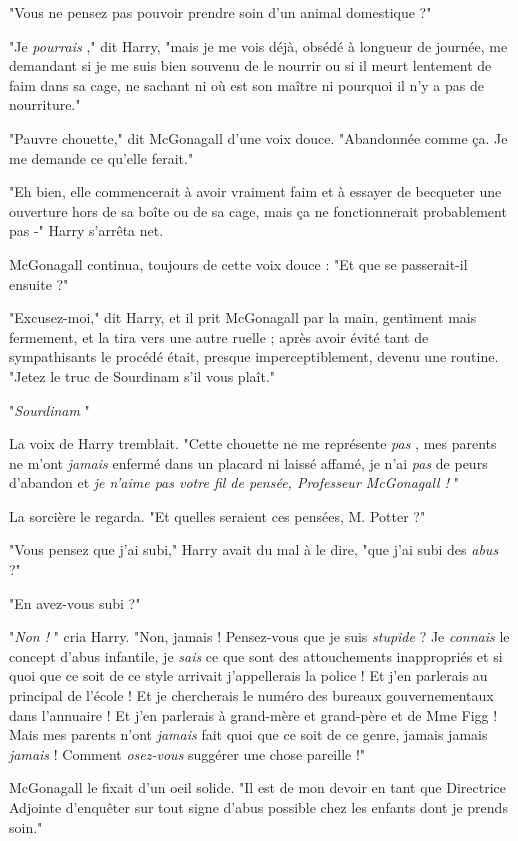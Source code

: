 "Vous ne pensez pas pouvoir prendre soin d'un animal domestique ?"

"Je \emph{pourrais} ," dit Harry, "mais je me vois déjà, obsédé à longueur de journée, me demandant si je me suis bien souvenu de le nourrir ou si il meurt lentement de faim dans sa cage, ne sachant ni où est son maître ni pourquoi il n'y a pas de nourriture."

"Pauvre chouette," dit McGonagall d'une voix douce. "Abandonnée comme ça. Je me demande ce qu'elle ferait."

"Eh bien, elle commencerait à avoir vraiment faim et à essayer de becqueter une ouverture hors de sa boîte ou de sa cage, mais ça ne fonctionnerait probablement pas -" Harry s'arrêta net.

McGonagall continua, toujours de cette voix douce : "Et que se passerait-il ensuite ?"

"Excusez-moi," dit Harry, et il prit McGonagall par la main, gentiment mais fermement, et la tira vers une autre ruelle ; après avoir évité tant de sympathisants le procédé était, presque imperceptiblement, devenu une routine. "Jetez le truc de Sourdinam s'il vous plaît."

"\emph{Sourdinam} "

La voix de Harry tremblait. "Cette chouette ne me représente \emph{pas} , mes parents ne m'ont \emph{jamais } enfermé dans un placard ni laissé affamé, je n'ai \emph{pas}  de peurs d'abandon et \emph{je n'aime pas votre fil de pensée, Professeur McGonagall !} "

La sorcière le regarda. "Et quelles seraient ces pensées, M. Potter ?"

"Vous pensez que j'ai subi," Harry avait du mal à le dire, "que j'ai subi des \emph{abus}  ?"

"En avez-vous subi ?"

"\emph{Non !} " cria Harry. "Non, jamais ! Pensez-vous que je suis \emph{stupide}  ? Je \emph{connais}  le concept d'abus infantile, je \emph{sais}  ce que sont des attouchements inappropriés et si quoi que ce soit de ce style arrivait j'appellerais la police ! Et j'en parlerais au principal de l'école ! Et je chercherais le numéro des bureaux gouvernementaux dans l'annuaire ! Et j'en parlerais à grand-mère et grand-père et de Mme Figg ! Mais mes parents n'ont \emph{jamais}  fait quoi que ce soit de ce genre, jamais jamais \emph{jamais}  ! Comment \emph{osez-vous } suggérer une chose pareille !"

McGonagall le fixait d'un oeil solide. "Il est de mon devoir en tant que Directrice Adjointe d'enquêter sur tout signe d'abus possible chez les enfants dont je prends soin."

